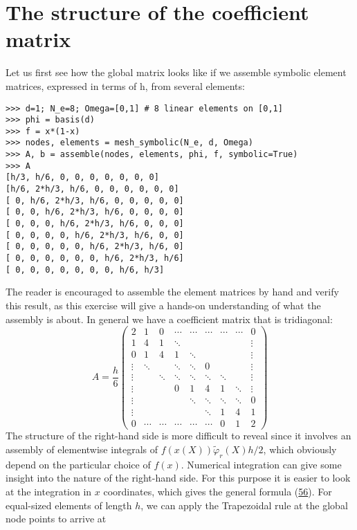 \documentclass[../main.tex]{subfiles}
\begin{document}
\section[The structure of the coefficient matrix]{The structure of the coefficient matrix}
\label{sec:sec_4_6}
\noindent Let us first see how the global matrix looks like if we assemble symbolic element
matrices, expressed in terms of h, from several elements:
\begin{lstlisting}[numbers=none]
>>> d=1; N_e=8; Omega=[0,1] # 8 linear elements on [0,1]
>>> phi = basis(d)
>>> f = x*(1-x)
>>> nodes, elements = mesh_symbolic(N_e, d, Omega)
>>> A, b = assemble(nodes, elements, phi, f, symbolic=True)
>>> A
[h/3, h/6, 0, 0, 0, 0, 0, 0, 0]
[h/6, 2*h/3, h/6, 0, 0, 0, 0, 0, 0]
[ 0, h/6, 2*h/3, h/6, 0, 0, 0, 0, 0]
[ 0, 0, h/6, 2*h/3, h/6, 0, 0, 0, 0]
[ 0, 0, 0, h/6, 2*h/3, h/6, 0, 0, 0]
[ 0, 0, 0, 0, h/6, 2*h/3, h/6, 0, 0]
[ 0, 0, 0, 0, 0, h/6, 2*h/3, h/6, 0]
[ 0, 0, 0, 0, 0, 0, h/6, 2*h/3, h/6]
[ 0, 0, 0, 0, 0, 0, 0, h/6, h/3]	
\end{lstlisting}
The reader is encouraged to assemble the element matrices by hand and verify
this result, as this exercise will give a hands-on understanding of what the
assembly is about. In general we have a coefficient matrix that is tridiagonal:
\begin{equation}\label{eqa79}
	A=\frac{h}{6}\left(\begin{array}{ccccccccc}
		2 & 1 & 0 & \cdots & \cdots & \cdots & \cdots & \cdots & 0 \\
		1 & 4 & 1 & \ddots & & & & & \vdots \\
		0 & 1 & 4 & 1 & \ddots & & & & \vdots \\
		\vdots & \ddots & & \ddots & \ddots & 0 & & & \vdots \\
		\vdots & & \ddots & \ddots & \ddots & \ddots & \ddots & & \vdots \\
		\vdots & & & 0 & 1 & 4 & 1 & \ddots & \vdots \\
		\vdots & & & & \ddots & \ddots & \ddots & \ddots & 0 \\
		\vdots & & & & & \ddots & 1 & 4 & 1 \\
		0 & \cdots & \cdots & \cdots & \cdots & \cdots & 0 & 1 & 2
	\end{array}\right)
\end{equation}
\bigbreak
The structure of the right-hand side is more difficult to reveal since it involves an assembly of elementwise integrals of $f(x(X)) \tilde{\varphi}_{r}(X) h / 2$, which obviously depend on the particular choice of $f(x)$. Numerical integration can give some insight into the nature of the right-hand side. For this purpose it is easier to look at the integration in $x$ coordinates, which gives the general formula (\hyperref[eqa56]{56}). For equal-sized elements of length $h$, we can apply the Trapezoidal rule at the global node points to arrive at
\end{document}
